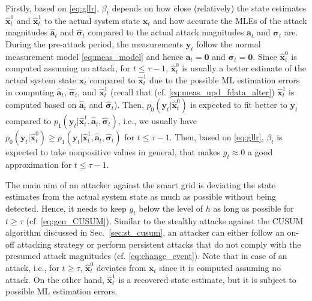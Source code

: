 \documentclass[onecolumn]{IEEEtran}
\begin{document}
Firstly, based on \eqref{eq:gllr}, $\beta_t$ depends on how close (relatively) the state estimates $\hat{\mathbf{x}}_t^0$ and $\hat{\mathbf{x}}_t^1$ to the actual system state $\mathbf{x}_t$ and how accurate the MLEs of the attack magnitudes $\hat{\mathbf{a}}_t$ and $\hat{\pmb{\sigma}}_t$ compared to the actual attack magnitudes ${\mathbf{a}}_t$ and ${\pmb{\sigma}}_t$ are. During the pre-attack period, the measurements $\mathbf{y}_t$ follow the normal measurement model \eqref{eq:meas_model} and hence $\mathbf{a}_t = \mathbf{0}$ and $\pmb{\sigma}_t = \mathbf{0}$. Since $\hat{\mathbf{x}}_t^0$ is computed assuming no attack, for $t \leq \tau-1$, $\hat{\mathbf{x}}_t^0$ is usually a better estimate of the actual system state $\mathbf{x}_t$ compared to $\hat{\mathbf{x}}_t^1$ due to the possible ML estimation errors in computing $\hat{\mathbf{a}}_t$, $\hat{\pmb{\sigma}}_t$, and $\hat{\mathbf{x}}_t^1$ (recall that (cf. \eqref{eq:meas_upd_fdata_alter}) $\hat{\mathbf{x}}_t^1$ is computed based on $\hat{\mathbf{a}}_t$ and $\hat{\pmb{\sigma}}_t$). Then, $p_0(\mathbf{y}_t|\hat{\mathbf{x}}_t^0)$ is expected to fit better to $\mathbf{y}_t$ compared to $p_1(\mathbf{y}_t|\hat{\mathbf{x}}_t^1, \hat{\mathbf{a}}_t, \hat{\pmb{\sigma}}_t)$, i.e., we usually have $p_0(\mathbf{y}_t|\hat{\mathbf{x}}_t^0) \geq p_1(\mathbf{y}_t|\hat{\mathbf{x}}_t^1, \hat{\mathbf{a}}_t, \hat{\pmb{\sigma}}_t)$ for $t \leq \tau-1$. Then, based on \eqref{eq:gllr}, $\beta_t$ is expected to take nonpositive values in general, that makes $g_t \approx 0$ a good approximation for $t \leq \tau-1$.

The main aim of an attacker against the smart grid is deviating the state estimates from the actual system state as much as possible without being detected. Hence, it needs to keep $g_t$ below the level of $h$ as long as possible for $t \geq \tau$ (cf. \eqref{eq:gen_CUSUM}). Similar to the stealthy attacks against the CUSUM algorithm discussed in Sec.~\ref{sec:st_cusum}, an attacker can either follow an on-off attacking strategy or perform persistent attacks that do not comply with the presumed attack magnitudes (cf. \eqref{eq:change_event}). Note that in case of an attack, i.e., for $t \geq \tau$, $\hat{\mathbf{x}}_t^0$ deviates from $\mathbf{x}_t$ since it is computed assuming no attack. On the other hand, $\hat{\mathbf{x}}_t^1$ is a recovered state estimate, but it is subject to possible ML estimation errors.

\end{document}

